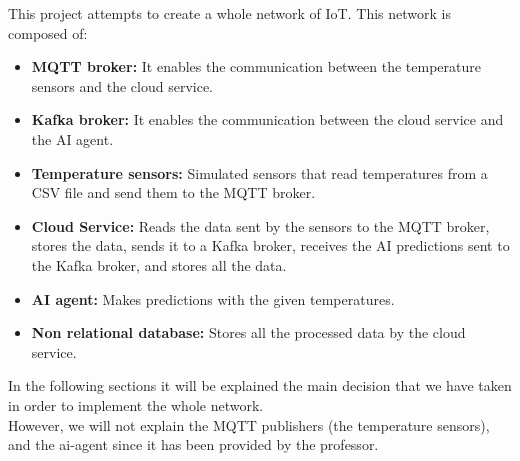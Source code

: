 \documentclass[../informe.tex]{subfiles}
\begin{document}
This project attempts to create a whole network of IoT. This network is composed of:
\begin{itemize}
  \item \textbf{MQTT broker:} It enables the communication between the temperature sensors and the cloud service.
  \item \textbf{Kafka broker:} It enables the communication between the cloud service and the AI agent.
  \item \textbf{Temperature sensors:} Simulated sensors that read temperatures from a CSV file and send them to the MQTT broker.
  \item \textbf{Cloud Service:} Reads the data sent by the sensors to the MQTT broker, stores the data, sends it to a Kafka broker, receives the AI predictions sent to the Kafka broker, and stores all the data.
  \item \textbf{AI agent:} Makes predictions with the given temperatures.
  \item \textbf{Non relational database:} Stores all the processed data by the cloud service.
\end{itemize}

In the following sections it will be explained the main decision that we have taken in order to implement the whole network. \\

However, we will not explain the MQTT publishers (the temperature sensors), and the ai-agent since it has been provided by the professor.
\end{document}
